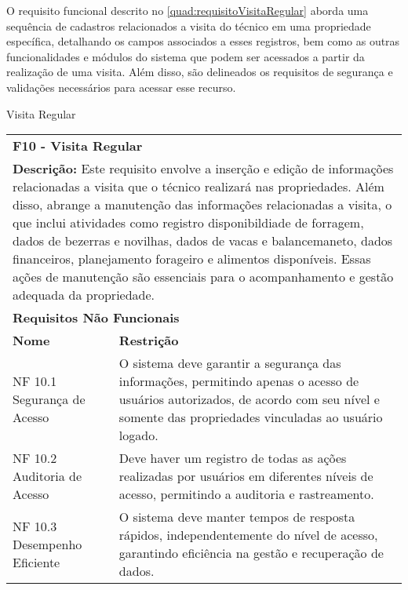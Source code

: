 O requisito funcional descrito no \autoref{quad:requisitoVisitaRegular}  aborda uma sequência de cadastros relacionados a visita do técnico em uma propriedade específica, detalhando os campos associados a esses registros, bem como as outras funcionalidades e módulos do sistema que podem ser acessados a partir da realização de uma visita. Além disso, são delineados os requisitos de segurança e validações necessários para acessar esse recurso.

\begin{tabframed}[htb]
  \caption{Visita Regular}
  \label{quad:requisitoVisitaRegular}
  \renewcommand{\arraystretch}{1.5}
  \begin{tabular}{|l|l|}
    \cline{1-2}
    \multicolumn{2}{|l|}{\textbf{F10 - Visita Regular}}
    \\ \cline{1-2}

    \multicolumn{2}{|p{15cm}|}{
    \raggedright \textbf{Descrição:} Este requisito envolve a inserção e edição de informações relacionadas a visita que o técnico realizará nas propriedades.
    Além disso, abrange a manutenção das informações relacionadas a  visita, o que inclui atividades como registro disponibildiade de forragem, dados de bezerras e novilhas, dados de vacas e balancemaneto, dados financeiros, planejamento forageiro e alimentos disponíveis. Essas ações de manutenção são essenciais para o acompanhamento e gestão adequada da propriedade.
    }
    \\ \cline{1-2}

    \multicolumn{2}{|l|}{\textbf{Requisitos Não Funcionais}}
    \\ \cline{1-2}

    \textbf{Nome}                             &
    \textbf{Restrição}
    \\ \cline{1-2}

    NF 10.1 Segurança de Acesso               &
    \multicolumn{1}{|p{8cm}|}{\raggedright O sistema deve garantir a segurança das informações, permitindo apenas o acesso de usuários autorizados, de acordo com seu nível e somente das propriedades vinculadas ao usuário logado.}
    \\ \cline{1-2}

    NF 10.2 Auditoria de Acesso               &
    \multicolumn{1}{|p{8cm}|}{\raggedright Deve haver um registro de todas as ações realizadas por usuários em diferentes níveis de acesso, permitindo a auditoria e rastreamento.}
    \\ \cline{1-2}

    NF 10.3 Desempenho Eficiente              &
    \multicolumn{1}{|p{8cm}|}{\raggedright O sistema deve manter tempos de resposta rápidos, independentemente do nível de acesso, garantindo eficiência na gestão e recuperação de dados.}
    \\ \cline{1-2}


\end{tabular}
\end{tabframed}
